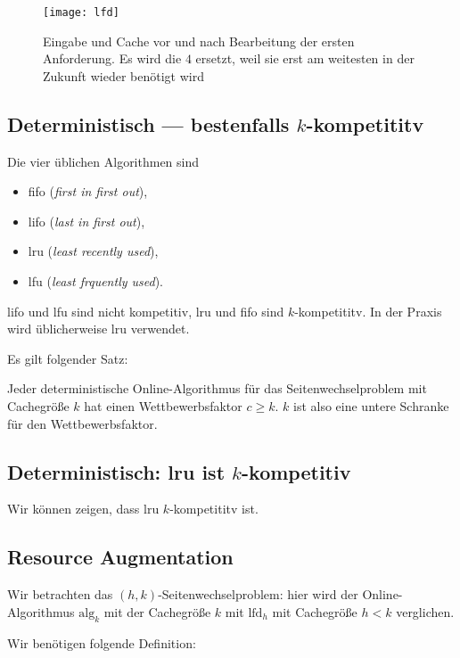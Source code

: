 \begin{figure}[H]
  \texttt{[image: lfd]}
  \captionsetup{width=.4\textwidth}
  \caption{Eingabe und Cache vor und nach Bearbeitung der ersten Anforderung. Es wird die \( 4 \) ersetzt, weil sie erst am weitesten in der Zukunft wieder benötigt wird}
\end{figure}

\subsection{Deterministisch --- bestenfalls \( k \)-kompetititv}

Die vier üblichen Algorithmen sind
\begin{itemize}
  \item fifo (\emph{first in first out}),
  \item lifo (\emph{last in first out}),
  \item lru (\emph{least recently used}),
  \item lfu (\emph{least frquently used}).
\end{itemize}

lifo und lfu sind nicht kompetitiv, lru und fifo sind \( k \)-kompetititv. In der Praxis wird üblicherweise lru verwendet.

Es gilt folgender Satz:

\begin{theorem}
  Jeder deterministische Online-Algorithmus für das Seitenwechselproblem mit Cachegröße \( k \) hat einen Wettbewerbsfaktor \( c \geq k \). \( k \) ist also eine untere Schranke für den Wettbewerbsfaktor.
\end{theorem}

\subsection{Deterministisch: lru ist \( k \)-kompetitiv}

Wir können zeigen, dass lru \( k \)-kompetititv ist.

\subsection{Resource Augmentation}

Wir betrachten das \( (h,k) \)-Seitenwechselproblem: hier wird der Online-Algorithmus \( \text{alg}_k \) mit der Cachegröße \( k \) mit \( \text{lfd}_h \) mit Cachegröße \( h < k \) verglichen.

Wir benötigen folgende Definition:


